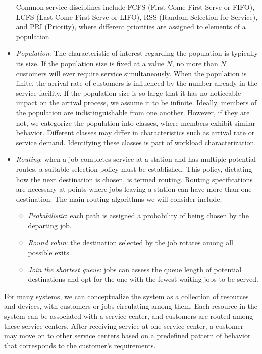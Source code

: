 \begin{itemize}
        Common service disciplines include FCFS (First-Come-First-Serve or FIFO), LCFS (Last-Come-First-Serve or LIFO), RSS (Random-Selection-for-Service), and PRI (Priority), where different priorities are assigned to elements of a population.
    \item \textit{Population}: The characteristic of interest regarding the population is typically its size. 
        If the population size is fixed at a value $N$, no more than $N$ customers will ever require service simultaneously.
        When the population is finite, the arrival rate of customers is influenced by the number already in the service facility.
        If the population size is so large that it has no noticeable impact on the arrival process, we assume it to be infinite. 
        Ideally, members of the population are indistinguishable from one another.
        However, if they are not, we categorize the population into classes, where members exhibit similar behavior. 
        Different classes may differ in characteristics such as arrival rate or service demand. 
        Identifying these classes is part of workload characterization.
    \item \textit{Routing}: when a job completes service at a station and has multiple potential routes, a suitable selection policy must be established. 
        This policy, dictating how the next destination is chosen, is termed routing.
        Routing specifications are necessary at points where jobs leaving a station can have more than one destination.
        The main routing algorithms we will consider include:
        \begin{itemize}
            \item \textit{Probabilistic}: each path is assigned a probability of being chosen by the departing job.
            \item \textit{Round robin}: the destination selected by the job rotates among all possible exits.
            \item \textit{Join the shortest queue}: jobs can assess the queue length of potential destinations and opt for the one with the fewest waiting jobs to be served.
        \end{itemize}
\end{itemize}
For many systems, we can conceptualize the system as a collection of resources and devices, with customers or jobs circulating among them. 
Each resource in the system can be associated with a service center, and customers are routed among these service centers.
After receiving service at one service center, a customer may move on to other service centers based on a predefined pattern of behavior that corresponds to the customer's requirements.

